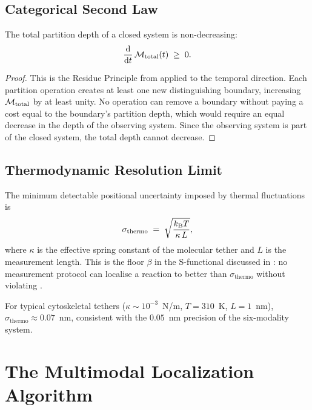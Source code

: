 \subsection{Categorical Second Law}

\begin{theorem}
\label{thm:second-law}
The total partition depth of a closed system is non-decreasing:
\begin{equation}
  \frac{\mathrm{d}}{\mathrm{d} t}\,\mathcal{M}_{\mathrm{total}}(t) \;\geq\; 0.
  \label{eq:second-law}
\end{equation}
\end{theorem}

\begin{proof}
This is the Residue Principle from  applied to the
temporal direction.  Each partition operation creates at least one new
distinguishing boundary, increasing $\mathcal{M}_{\mathrm{total}}$ by at least
unity.  No operation can remove a boundary without paying a cost equal to
the boundary's partition depth, which would require an equal decrease in the
depth of the observing system.  Since the observing system is part of the
closed system, the total depth cannot decrease.
\end{proof}

\subsection{Thermodynamic Resolution Limit}

The minimum detectable positional uncertainty imposed by thermal fluctuations is
\begin{equation}
  \sigma_{\mathrm{thermo}}
  \;=\; \sqrt{\frac{k_{\mathrm{B}} T}{\kappa\,L}},
  \label{eq:thermo-limit}
\end{equation}
where $\kappa$ is the effective spring constant of the molecular tether and
$L$ is the measurement length.  This is the floor $\beta$ in the S-functional
discussed in : no measurement protocol can
localise a reaction to better than $\sigma_{\mathrm{thermo}}$ without
violating .

For typical cytoskeletal tethers ($\kappa \sim 10^{-3}$~N/m,
$T = 310$~K, $L = 1$~nm), $\sigma_\mathrm{thermo} \approx 0.07$~nm, consistent
with the $0.05$~nm precision of the six-modality system.

\section{The Multimodal Localization Algorithm}
\label{sec:localization-alg}

